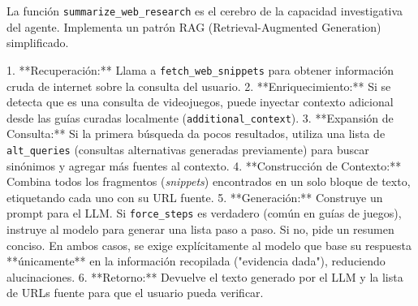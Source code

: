 \documentclass[letterpaper,12pt]{article}
\begin{document}
La función \texttt{summarize\_web\_research} es el cerebro de la capacidad investigativa del agente. Implementa un patrón RAG (Retrieval-Augmented Generation) simplificado.

1. **Recuperación:** Llama a \texttt{fetch\_web\_snippets} para obtener información cruda de internet sobre la consulta del usuario.
2. **Enriquecimiento:** Si se detecta que es una consulta de videojuegos, puede inyectar contexto adicional desde las guías curadas localmente (\texttt{additional\_context}).
3. **Expansión de Consulta:** Si la primera búsqueda da pocos resultados, utiliza una lista de \texttt{alt\_queries} (consultas alternativas generadas previamente) para buscar sinónimos y agregar más fuentes al contexto.
4. **Construcción de Contexto:** Combina todos los fragmentos (\textit{snippets}) encontrados en un solo bloque de texto, etiquetando cada uno con su URL fuente.
5. **Generación:** Construye un prompt para el LLM. Si \texttt{force\_steps} es verdadero (común en guías de juegos), instruye al modelo para generar una lista paso a paso. Si no, pide un resumen conciso. En ambos casos, se exige explícitamente al modelo que base su respuesta **únicamente** en la información recopilada ("evidencia dada"), reduciendo alucinaciones.
6. **Retorno:** Devuelve el texto generado por el LLM y la lista de URLs fuente para que el usuario pueda verificar.
\end{document}

